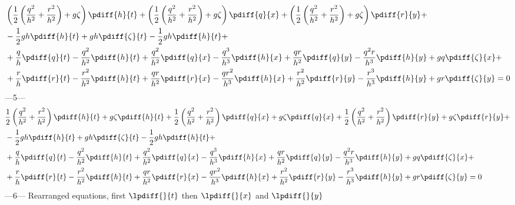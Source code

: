 \begin{align}
    & \left( \half \left( \frac{q^2}{h^2} + \frac{r^2}{h^2} \right)+ g\zeta  \right) \pdiff{h}{t}
    + \left( \half \left( \frac{q^2}{h^2} + \frac{r^2}{h^2} \right)+ g\zeta  \right) \pdiff{q}{x}
    + \left( \half \left( \frac{q^2}{h^2} + \frac{r^2}{h^2} \right)+ g\zeta  \right) \pdiff{r}{y} +
    \\*
    & -\half gh \pdiff{h}{t} + gh \pdiff{\zeta}{t} -\half gh \pdiff{h}{t} +
    \\*
    &+
    \frac{q}{h}\pdiff{q}{t}
    - \frac{q^2}{h^2}  \pdiff{h}{t} + \frac{q^2}{h^2}\pdiff{q}{x}
    - \frac{q^3}{h^3}  \pdiff{h}{x} + \frac{qr}{h^2}\pdiff{q}{y}
    - \frac{q^2r}{h^3} \pdiff{h}{y}
    + g q \pdiff{\zeta}{x} +
    \\*
    &+
    \frac{r}{h} \pdiff{r}{t}
    - \frac{r^2}{h^2} \pdiff{h}{t}
    + \frac{qr}{h^2}  \pdiff{r}{x} - \frac{qr^2}{h^3}\pdiff{h}{x}
    + \frac{r^2}{h^2} \pdiff{r}{y} - \frac{r^3}{h^3}\pdiff{h}{y}
    + g r \pdiff{\zeta}{y} = 0
\end{align}
---5---
\begin{align}
    & \half \left( \frac{q^2}{h^2} + \frac{r^2}{h^2} \right) \pdiff{h}{t} + g\zeta  \pdiff{h}{t}
    + \half \left( \frac{q^2}{h^2} + \frac{r^2}{h^2} \right) \pdiff{q}{x} + g\zeta \pdiff{q}{x}
    + \half \left( \frac{q^2}{h^2} + \frac{r^2}{h^2} \right) \pdiff{r}{y} + g\zeta \pdiff{r}{y} +
    \\*
    & -\half gh \pdiff{h}{t} + gh \pdiff{\zeta}{t} -\half gh \pdiff{h}{t} +
    \\*
    &+
    \frac{q}{h}\pdiff{q}{t}
    - \frac{q^2}{h^2}  \pdiff{h}{t} + \frac{q^2}{h^2}\pdiff{q}{x}
    - \frac{q^3}{h^3}  \pdiff{h}{x} + \frac{qr}{h^2}\pdiff{q}{y}
    - \frac{q^2r}{h^3} \pdiff{h}{y}
    + g q \pdiff{\zeta}{x} +
    \\*
    &+
    \frac{r}{h} \pdiff{r}{t}
    - \frac{r^2}{h^2} \pdiff{h}{t}
    + \frac{qr}{h^2}  \pdiff{r}{x} - \frac{qr^2}{h^3}\pdiff{h}{x}
    + \frac{r^2}{h^2} \pdiff{r}{y} - \frac{r^3}{h^3}\pdiff{h}{y}
    + g r \pdiff{\zeta}{y} = 0
\end{align}
---6---\newline
Rearranged equations, first $\lpdiff{}{t}$ then $\lpdiff{}{x}$ and $\lpdiff{}{y}$
